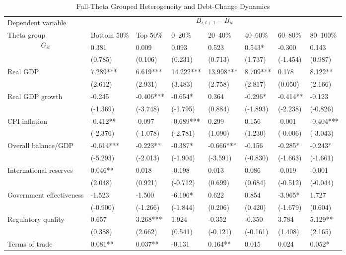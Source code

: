 \begin{table}[H]\centering
\begin{threeparttable}
\caption{Full-Theta Grouped Heterogeneity and Debt-Change Dynamics}
\label{tab:theta_group_heterogeneity_debt}
\scriptsize
\begin{tabularx}{\textwidth}{lYYYYYYY}
\toprule
Dependent variable &  \\
\cmidrule(lr){2-8}
Theta group & Bottom 50\% & Top 50\% & 0--20\% & 20--40\% & 40--60\% & 60--80\% & 80--100\% \\
\midrule
$$G_{it}$$ & 0.381 & 0.009 & 0.093 & 0.523 & 0.543* & -0.300 & 0.143 \\
  & (0.785) & (0.106) & (0.231) & (0.713) & (1.737) & (-1.454) & (0.987) \\
Real GDP & 7.289*** & 6.619*** & 14.222*** & 13.998*** & 8.709*** & 0.178 & 8.122** \\
  & (2.612) & (2.931) & (3.483) & (2.758) & (2.817) & (0.050) & (2.166) \\
Real GDP growth & -0.245 & -0.406*** & -0.654* & 0.364 & -0.296* & -0.414** & -0.123 \\
  & (-1.369) & (-3.748) & (-1.795) & (0.884) & (-1.893) & (-2.238) & (-0.826) \\
CPI inflation & -0.412** & -0.097 & -0.689*** & 0.299 & 0.156 & -0.001 & -0.404*** \\
  & (-2.376) & (-1.078) & (-2.781) & (1.090) & (1.230) & (-0.006) & (-3.043) \\
Overall balance/GDP & -0.614*** & -0.223** & -0.387* & -0.666*** & -0.156 & -0.285* & -0.243* \\
  & (-5.293) & (-2.013) & (-1.904) & (-3.591) & (-0.830) & (-1.663) & (-1.661) \\
International reserves & 0.046** & 0.018 & -0.198 & 0.013 & 0.086 & -0.019 & -0.001 \\
  & (2.048) & (0.921) & (-0.712) & (0.699) & (0.684) & (-0.512) & (-0.044) \\
Government effectiveness & -1.523 & -1.500 & -6.196* & 0.622 & 0.854 & -3.965* & 1.727 \\
  & (-0.900) & (-1.266) & (-1.844) & (0.206) & (0.420) & (-1.679) & (0.604) \\
Regulatory quality & 0.657 & 3.268*** & 1.924 & -0.352 & -0.350 & 3.784 & 5.129** \\
  & (0.388) & (2.662) & (0.541) & (-0.121) & (-0.161) & (1.408) & (2.165) \\
Terms of trade & 0.081** & 0.037** & -0.131 & 0.164** & 0.015 & 0.024 & 0.052* \\

\end{tabularx}
\end{threeparttable}
\end{table}
